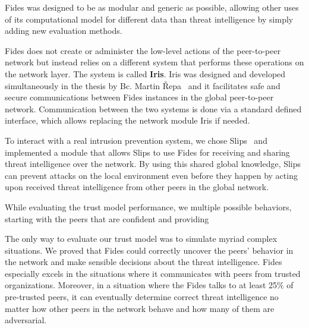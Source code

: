 Fides was designed to be as modular and generic as possible, allowing other uses of its computational model for different data than threat intelligence by simply adding new evaluation methods.

Fides does not create or administer the low-level actions of the peer-to-peer network but instead relies on a different system that performs these operations on the network layer. The system is called \textbf{Iris}. Iris was designed and developed simultaneously in the thesis by Bc. Martin Řepa~\cite{nl} and it facilitates safe and secure communications between Fides instances in the global peer-to-peer network. Communication between the two systems is done via a standard defined interface, which allows replacing the network module Iris if needed.

To interact with a real intrusion prevention system, we chose Slips~\cite{slips} and implemented a module that allows Slips to use Fides for receiving and sharing threat intelligence over the network. 
By using this shared global knowledge, Slips can prevent attacks on the local environment even before they happen by acting upon received threat intelligence from other peers in the global network.

While evaluating the trust model performance, we multiple possible behaviors, starting with the peers that are confident and providing 

The only way to evaluate our trust model was to simulate myriad complex situations. We proved that Fides could correctly uncover the peers' behavior in the network and make sensible decisions about the threat intelligence. 
Fides especially excels in the situations where it communicates with peers from trusted organizations.
Moreover, in a situation where the Fides talks to at least 25\% of pre-trusted peers, it can eventually determine correct threat intelligence no matter how other peers in the network behave and how many of them are adversarial.

